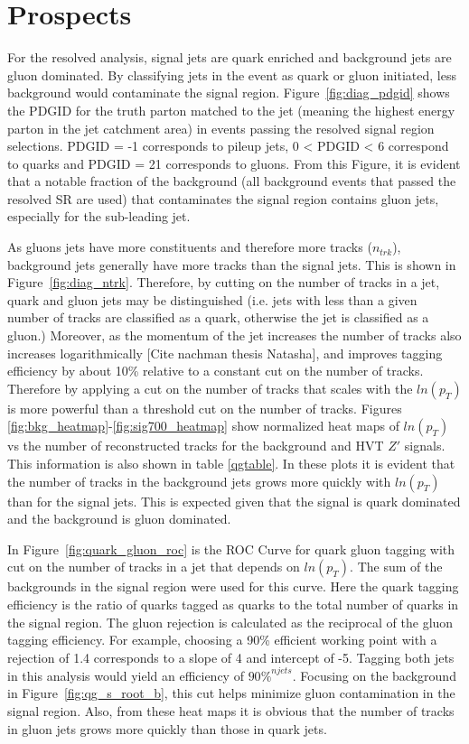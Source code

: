 \label{ch:qg}
\chapter{Prospects}
For the resolved analysis, signal jets are quark enriched and background jets are gluon dominated. By classifying jets in the event as quark or gluon initiated, less background would contaminate the signal region. Figure~\ref{fig:diag_pdgid} shows the PDGID for the truth parton matched to the jet (meaning the highest energy parton in the jet catchment area) in events passing the resolved signal region selections. PDGID = -1 corresponds to pileup jets, 0 < PDGID < 6 correspond to quarks and PDGID = 21 corresponds to gluons. From this Figure, it is evident that a notable fraction of the background (all background events that passed the resolved SR are used) that contaminates the signal region contains gluon jets, especially for the sub-leading jet. 

As gluons jets have more constituents and therefore more tracks ($n_{trk}$), background jets generally have more tracks than the signal jets. This is shown in Figure~\ref{fig:diag_ntrk}. Therefore, by cutting on the number of tracks in a jet, quark and gluon jets may be distinguished (i.e. jets with less than a given number of tracks are classified as a quark, otherwise the jet is classified as a gluon.) Moreover, as the momentum of the jet increases the number of tracks also increases logarithmically [Cite nachman thesis Natasha], and improves tagging efficiency by about 10\% relative to a constant cut on the number of tracks. Therefore by applying a cut on the number of tracks that scales with the $ln(p_{T})$ is more powerful than a threshold cut on the number of tracks. Figures \ref{fig:bkg_heatmap}-\ref{fig:sig700_heatmap} show normalized heat maps of $ln(p_{T})$ vs the number of reconstructed tracks for the background and HVT $Z'$ signals. This information is also shown in table \ref{qgtable}. In these plots it is evident that the number of tracks in the background jets grows more quickly with $ln(p_{T})$ than for the signal jets. This is expected given that the signal is quark dominated and the background is gluon dominated. 

In Figure~\ref{fig:quark_gluon_roc} is the ROC Curve for quark gluon tagging with cut on the number of tracks in a jet that depends on $ln(p_{T})$. The sum of the backgrounds in the signal region were used for this curve. Here the quark tagging efficiency is the ratio of quarks tagged as quarks to the total number of quarks in the signal region. The gluon rejection is calculated as the reciprocal of the gluon tagging efficiency. For example, choosing a 90\% efficient working point with a rejection of 1.4 corresponds to a slope of 4 and intercept of -5. Tagging both jets in this analysis would yield an efficiency of $90\%^{njets}$. Focusing on the background in Figure~\ref{fig:qg_s_root_b}, this cut helps minimize gluon contamination in the signal region. Also, from these heat maps it is obvious that the number of tracks in gluon jets grows more quickly than those in quark jets.
\pagebreak

